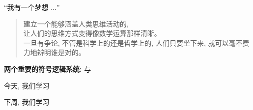 \begin{frame}{``我有一个梦想 $\ldots$''}
  \begin{quote}
    建立一个能够涵盖人类思维活动的,\\
    让人们的思维方式变得像数学运算那样清晰。\\[8pt]

    一旦有争论, 不管是科学上的还是哲学上的,
    人们只要坐下来,
    就可以毫不费力地辨明谁是对的。
  \end{quote}

  \vspace{0.80cm}
  \begin{quote}
    \centerline{}
  \end{quote}
\end{frame}


\begin{frame}{}
  \begin{center}
    {\bf 两个重要的符号逻辑系统:}  与 


    \vspace{0.50cm}
  \end{center}
\end{frame}

\begin{frame}{}
  \begin{center}
    今天, 我们学习


    下周, 我们学习
  \end{center}
\end{frame}
